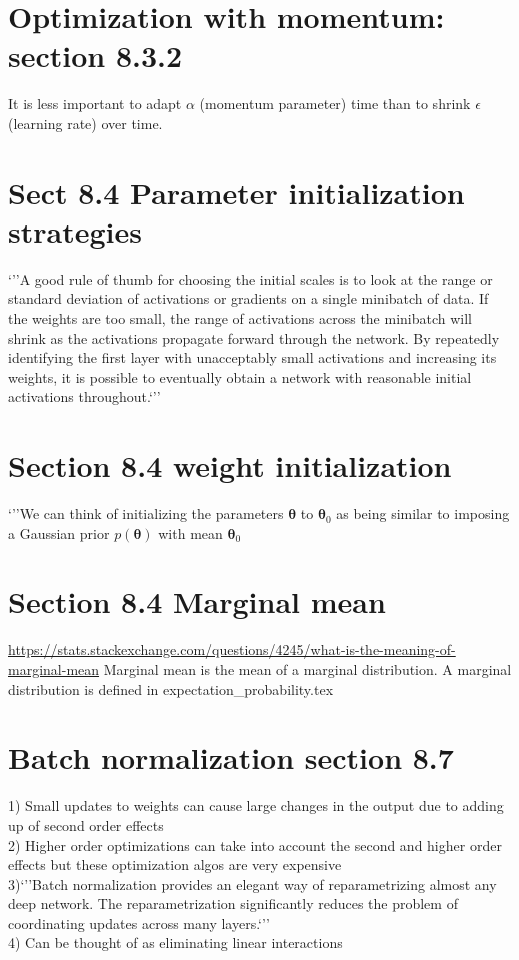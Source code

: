 \documentclass{article}
\begin{document}
\section{Optimization with momentum: section 8.3.2}
It is less important to adapt $\alpha$ (momentum parameter) time than to shrink $\epsilon$ (learning rate)  over time.


%
%
%

\section{Sect 8.4 Parameter initialization strategies}
`''A good rule of thumb for choosing the initial scales is to
look at the range or standard deviation of activations or gradients on a single
minibatch of data. If the weights are too small, the range of activations across the
minibatch will shrink as the activations propagate forward through the network.
By repeatedly identifying the first layer with unacceptably small activations and
increasing its weights, it is possible to eventually obtain a network with reasonable
initial activations throughout.`''

%
%
%

\section{Section 8.4 weight initialization}
`''We can think of initializing the parameters $\pmb{\theta}$ to $\pmb{\theta}_0$ as being similar to imposing a Gaussian prior $p(\pmb{\theta})$ with mean $\pmb{\theta}_0$
%
%
%
\section{Section 8.4 Marginal mean}
\url{https://stats.stackexchange.com/questions/4245/what-is-the-meaning-of-marginal-mean} Marginal mean is the mean of a marginal distribution. A marginal distribution is defined in expectation\_probability.tex
%
%
%
\section{Batch normalization section 8.7}
1) Small updates to weights can cause large changes in the output due to adding up of second order effects\\
2) Higher order optimizations can take into account the second and higher order effects but these optimization algos are very expensive\\
3)`''Batch normalization provides an elegant way of reparametrizing almost any deep
network. The reparametrization significantly reduces the problem of coordinating
updates across many layers.`''\\
4) Can be thought of as eliminating linear interactions
%
%
%
\end{document}
